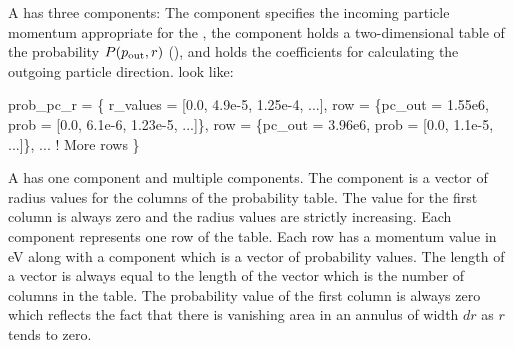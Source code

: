 A  has three components: The  component specifies the incoming
particle momentum appropriate for the , the  component holds a
two-dimensional table of the probability $P(p_{\text{out}}, r)$ (), and 
holds the coefficients for calculating the outgoing particle direction.  look like:
\begin{example}
  prob_pc_r = \{
    r_values = [0.0, 4.9e-5, 1.25e-4, ...],
    row = \{pc_out = 1.55e6, prob = [0.0, 6.1e-6, 1.23e-5, ...]\}, 
    row = \{pc_out = 3.96e6, prob = [0.0, 1.1e-5, ...]\},
    ...                   ! More rows
  \}
\end{example}
A  has one  component and multiple  components. The
 component is a vector of radius values for the columns of the probability table.  The
value for the first column is always zero and the radius values are strictly increasing.  Each
 component represents one row of the table. Each row has a momentum value  in eV
along with a  component which is a vector of probability values. The length of a 
vector is always equal to the length of the  vector which is the number of columns in
the table. The probability value of the first column is always zero which reflects the fact that
there is vanishing area in an annulus of width $dr$ as $r$ tends to zero.

